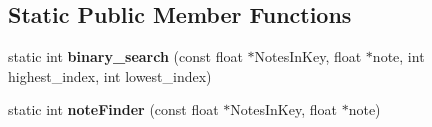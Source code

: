 \subsection*{Static Public Member Functions}
\begin{DoxyCompactItemize}
\item 
\hypertarget{classvocoder_a54dbb5d460704f880382d2ae7e64e14a}{static int {\bfseries binary\-\_\-search} (const float $\ast$Notes\-In\-Key, float $\ast$note, int highest\-\_\-index, int lowest\-\_\-index)}\label{classvocoder_a54dbb5d460704f880382d2ae7e64e14a}

\item 
\hypertarget{classvocoder_a450b5c7824587e81db5aa4c056ba6934}{static int {\bfseries note\-Finder} (const float $\ast$Notes\-In\-Key, float $\ast$note)}\label{classvocoder_a450b5c7824587e81db5aa4c056ba6934}

\end{DoxyCompactItemize}

